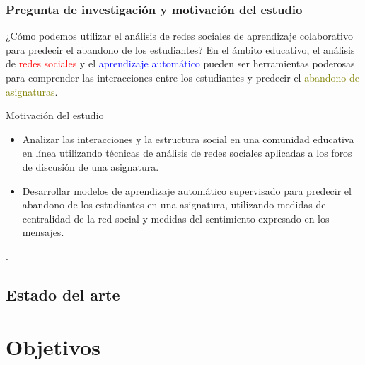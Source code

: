 \documentclass{beamer}
\begin{document}
\begin{frame}
	\frametitle{Pregunta de investigación y motivación del estudio}
	\begin{block}{¿Cómo podemos utilizar el análisis de redes sociales de aprendizaje colaborativo para predecir el abandono de los estudiantes?}
	En el ámbito educativo, el análisis de \textcolor{red}{redes sociales} y el \textcolor{blue}{aprendizaje automático} pueden ser herramientas poderosas para comprender las interacciones entre los estudiantes y predecir el \textcolor{olive}{abandono de asignaturas}. 
	\end{block}
	\begin{block}{Motivación del estudio}
	\begin{itemize}
	\item  Analizar las interacciones y la estructura social en una comunidad educativa en línea utilizando técnicas de análisis de redes sociales aplicadas a los foros de discusión de una asignatura.
	\item  Desarrollar modelos de aprendizaje automático supervisado para predecir el abandono de los estudiantes en una asignatura, utilizando medidas de centralidad de la red social y medidas del sentimiento expresado en los mensajes.
	\end{itemize}. 
	\end{block}
\end{frame}

\subsection{Estado del arte}


\section{Objetivos}
\end{document}
